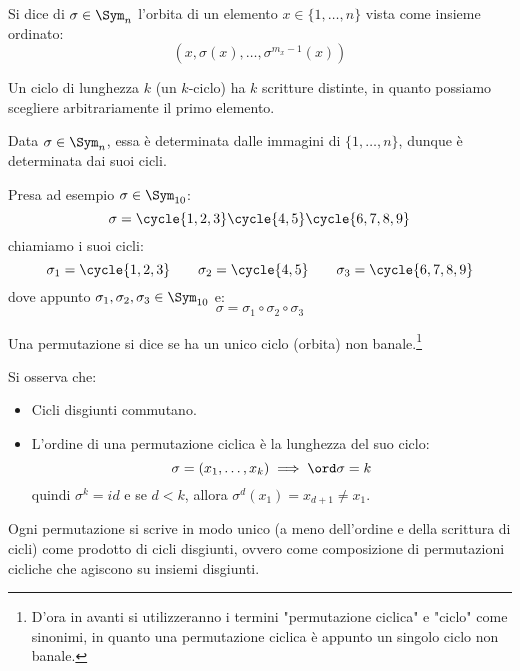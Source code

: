 \documentclass[11pt]{scrartcl}
\begin{document}
\begin{definition}
    Si dice  di $\sigma \in \Sym_n$ l'orbita di un elemento $x \in \{1,\ldots,n\}$ vista come insieme ordinato:
        \[ (x,\sigma(x),\ldots,\sigma^{m_x-1}(x))
            \]
\end{definition}

\begin{remark}
    Un ciclo di lunghezza $k$ (un $k$-ciclo) ha $k$ scritture distinte, in quanto possiamo scegliere arbitrariamente il primo elemento.
\end{remark}

\begin{remark}
    Data $\sigma \in \Sym_n$, essa è determinata dalle immagini di $\{1,\ldots,n\}$, dunque è determinata dai suoi cicli.
\end{remark}

\begin{example}
    Presa ad esempio $\sigma \in \Sym_{10}$:
        \[ \sigma = \cycle{1,2,3}\cycle{4,5}\cycle{6,7,8,9}
            \]
    chiamiamo i suoi cicli:
        \[ \sigma_1 = \cycle{1,2,3} \qquad \sigma_2 = \cycle{4,5} \qquad \sigma_3 = \cycle{6,7,8,9}
            \]
    dove appunto $\sigma_1,\sigma_2,\sigma_3 \in \Sym_{10}$ e:
        \[ \sigma = \sigma_1 \circ \sigma_2 \circ \sigma_3
            \]
\end{example}

\begin{definition}
    Una permutazione si dice  se ha un unico ciclo (orbita) non banale.\footnote{D'ora in avanti si utilizzeranno i termini "permutazione ciclica" e "ciclo" come sinonimi, in quanto una permutazione ciclica è appunto un singolo ciclo non banale.}
\end{definition}

\begin{remark}
    Si osserva che:
        \begin{itemize}
            \item Cicli disgiunti commutano.
            \item L'ordine di una permutazione ciclica è la lunghezza del suo ciclo:
                    \[ \sigma = (x_1,\ldots,x_k) \implies \ord \sigma = k
                        \]
                quindi $\sigma^k = id$ e se $d < k$, allora $\sigma^d(x_1) = x_{d+1} \ne x_1$.
        \end{itemize}
\end{remark}

\begin{proposition}
    \label{perm}
    Ogni permutazione si scrive in modo unico (a meno dell'ordine e della scrittura di cicli) come prodotto di cicli disgiunti,
     ovvero come composizione di permutazioni cicliche che agiscono su insiemi disgiunti.
\end{proposition}
\end{document}
